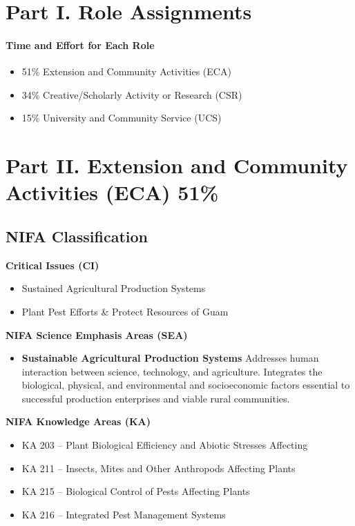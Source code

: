 \pagebreak

\section{Part I. Role Assignments}
\paragraph{Time and Effort for Each Role}
\begin{itemize}
	\item 51\% Extension and Community Activities (ECA)
	\item 34\% Creative/Scholarly Activity or Research (CSR)
	\item 15\% University and Community Service (UCS)
\end{itemize}

\section{Part II. Extension and Community Activities (ECA) 51\%}

\subsection{NIFA Classification}

\textbf{Critical Issues (CI)}
\begin{itemize}
\item Sustained Agricultural Production Systems
\item Plant Pest Efforts \& Protect Resources of Guam
\end{itemize}

\textbf{NIFA Science Emphasis Areas (SEA)}
\begin{itemize}
\item \textbf{Sustainable Agricultural Production Systems} Addresses human interaction between science, technology, and agriculture. Integrates the biological, physical, and environmental and socioeconomic factors essential to successful production enterprises and viable rural communities. 
\end{itemize}

\textbf{NIFA Knowledge Areas (KA)}
\begin{itemize}
\item KA 203 – Plant Biological Efficiency and Abiotic Stresses Affecting
\item KA 211 – Insects, Mites and Other Anthropods Affecting Plants
\item KA 215 – Biological Control of Pests Affecting Plants
\item KA 216 – Integrated Pest Management Systems
\end{itemize}


